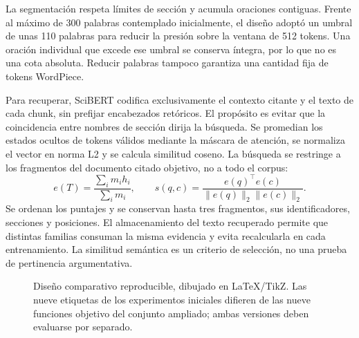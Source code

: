 \documentclass[10pt,a4paper,twocolumn]{article}
\begin{document}
La segmentación respeta límites de sección y acumula oraciones contiguas. Frente al máximo de 300 palabras contemplado inicialmente, el diseño adoptó un umbral de unas 110 palabras para reducir la presión sobre la ventana de 512 tokens. Una oración individual que excede ese umbral se conserva íntegra, por lo que no es una cota absoluta. Reducir palabras tampoco garantiza una cantidad fija de tokens WordPiece.

Para recuperar, SciBERT codifica exclusivamente el contexto citante y el texto de cada chunk, sin prefijar encabezados retóricos. El propósito es evitar que la coincidencia entre nombres de sección dirija la búsqueda. Se promedian los estados ocultos de tokens válidos mediante la máscara de atención, se normaliza el vector en norma L2 y se calcula similitud coseno. La búsqueda se restringe a los fragmentos del documento citado objetivo, no a todo el corpus:
\[
 e(T)=\frac{\sum_i m_i h_i}{\sum_i m_i},\qquad
 s(q,c)=\frac{e(q)^\top e(c)}{\|e(q)\|_2\|e(c)\|_2}.
\]
Se ordenan los puntajes y se conservan hasta tres fragmentos, sus identificadores, secciones y posiciones. El almacenamiento del texto recuperado permite que distintas familias consuman la misma evidencia y evita recalcularla en cada entrenamiento. La similitud semántica es un criterio de selección, no una prueba de pertinencia argumentativa.

\begin{figure}[t]
\centering
{}
\caption{Diseño comparativo reproducible, dibujado en LaTeX/TikZ. Las nueve etiquetas de los experimentos iniciales difieren de las nueve funciones objetivo del conjunto ampliado; ambas versiones deben evaluarse por separado.}\label{fig:flujo}
\end{figure}
\end{document}

